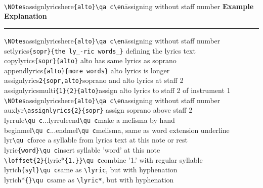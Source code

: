 \documentclass[twoside]{article}
\def\musixlyr{{\tt musixlyr}}
\begin{document}
\centering{\LARGE\bf \musixlyr\ --- commands}\\[1ex]

\thispagestyle{empty}


\def\keyexample#1{#1}

\noindent\begin{tabbing}
\verb|\NOtes|\keyexample{assignlyricshere}\verb|{alto}\qa c\en|\quad\= assigning without staff number\kill
{\bf Example}\> {\bf Explanation}
\end{tabbing}
\vspace{-1ex}
\hrule
\vspace{-2ex}
\begin{tabbing}
\verb|\NOtes|\keyexample{assignlyricshere}\verb|{alto}\qa c\en|\quad\= assigning without staff number\kill
\keyexample{setlyrics}\verb|{sopr}{the ly_-ric words_}|\> defining the lyrics text\\
\keyexample{copylyrics}\verb|{sopr}{alto}|\> alto has same lyrics as soprano\\
\keyexample{appendlyrics}\verb|{alto}{more words}|\> alto lyrics is longer\\
\keyexample{assignlyrics}\verb|2{sopr,alto}|\>soprano and alto lyrics at staff 2\\
\keyexample{assignlyricsmulti}\verb|{1}{2}{alto}|\>assign alto lyrics to staff 2 of instrument 1\\
\verb|\NOtes|\keyexample{assignlyricshere}\verb|{alto}\qa c\en|\>assigning without staff number\\
\keyexample{auxlyr}\verb|\assignlyrics{2}{sopr}|\> assign soprano above staff 2\\[.8ex]
\keyexample{lyrrule}\verb|\qu c|...\keyexample{lyrruleend}\verb|\qu c|\>make a melisma by hand\\
\keyexample{beginmel}\verb|\qu c|...\keyexample{endmel}\verb|\qu c|\>melisma, same as word extension underline\\[.8ex]
\keyexample{lyr}\verb|\qu c|\>force a syllable from lyrics text at this note or rest\\
\keyexample{lyric}\verb|{word}\qu c|\>insert syllable 'word' at this note\\
\verb|\loffset{2}{|\keyexample{lyric*}\verb|{1.}}\qu c|\>combine '1.' with regular syllable\\
\keyexample{lyrich}\verb|{syl}\qu c|\>same as \verb|\lyric|, but with hyphenation\\
\keyexample{lyrich*}\verb|{}\qu c|\>same as \verb|\lyric*|, but with hyphenation\\

\end{tabbing}
\end{document}
